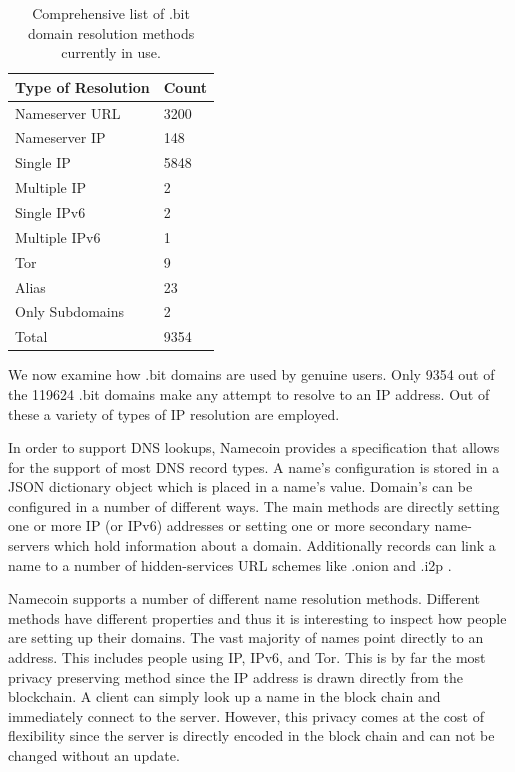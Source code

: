 \begin{table}[t]
\centering
\begin{tabular}{ll}
Type of Resolution & Count \\ \hline
Nameserver URL     & 3200  \\
Nameserver IP      & 148   \\
Single IP          & 5848  \\
Multiple IP        & 2     \\
Single IPv6        & 2     \\
Multiple IPv6      & 1     \\
Tor                & 9    \\
Alias              & 23    \\
Only Subdomains    & 2   \\ \hline
Total              & 9354
\end{tabular}
\caption{Comprehensive list of .bit domain resolution methods currently in use.}
\end{table}

We now examine how .bit domains are used by genuine users. Only 9354 out of the 119624 .bit domains make any attempt to resolve to an IP address. Out of these a variety of types of IP resolution are employed.

In order to support DNS lookups, Namecoin provides a specification that allows for the support of most DNS record types. A name's configuration is stored in a JSON dictionary object which is placed in a name's value. Domain's can be configured in a number of different ways. The main methods are directly setting one or more IP (or IPv6) addresses or setting one or more secondary name-servers which hold information about a domain. Additionally records can link a name to a number of hidden-services URL schemes like .onion \cite{onion} and .i2p \cite{i2p}.

Namecoin supports a number of different name resolution methods. Different methods have different properties and thus it is interesting to inspect how people are setting up their domains. The vast majority of names point directly to an address. This includes people using IP, IPv6, and Tor. This is by far the most privacy preserving method since the IP address is drawn directly from the blockchain. A client can simply look up a name in the block chain and immediately connect to the server. However, this privacy comes at the cost of flexibility since the server is directly encoded in the block chain and can not be changed without an update.


